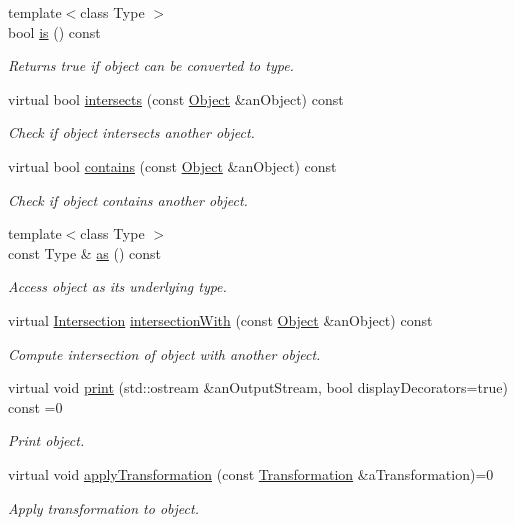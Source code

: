 \begin{DoxyCompactItemize}
{\footnotesize template$<$class Type $>$ }\\bool \hyperlink{classostk_1_1math_1_1geom_1_1d3_1_1_object_ab09a0b47da3dc0ca2d8170aced1ead15}{is} () const
\begin{DoxyCompactList}\small\item\em Returns true if object can be converted to type. \end{DoxyCompactList}\item 
virtual bool \hyperlink{classostk_1_1math_1_1geom_1_1d3_1_1_object_a99bfe722e7508a09a629c9eb972201e6}{intersects} (const \hyperlink{classostk_1_1math_1_1geom_1_1d3_1_1_object}{Object} \&an\+Object) const
\begin{DoxyCompactList}\small\item\em Check if object intersects another object. \end{DoxyCompactList}\item 
virtual bool \hyperlink{classostk_1_1math_1_1geom_1_1d3_1_1_object_a97edbd679b50c4663d3ab20c65cea4b9}{contains} (const \hyperlink{classostk_1_1math_1_1geom_1_1d3_1_1_object}{Object} \&an\+Object) const
\begin{DoxyCompactList}\small\item\em Check if object contains another object. \end{DoxyCompactList}\item 
{\footnotesize template$<$class Type $>$ }\\const Type \& \hyperlink{classostk_1_1math_1_1geom_1_1d3_1_1_object_ad921120c3bf1176035258fad0f654137}{as} () const
\begin{DoxyCompactList}\small\item\em Access object as its underlying type. \end{DoxyCompactList}\item 
virtual \hyperlink{classostk_1_1math_1_1geom_1_1d3_1_1_intersection}{Intersection} \hyperlink{classostk_1_1math_1_1geom_1_1d3_1_1_object_a04622921234740473c7731fa6c5bad0a}{intersection\+With} (const \hyperlink{classostk_1_1math_1_1geom_1_1d3_1_1_object}{Object} \&an\+Object) const
\begin{DoxyCompactList}\small\item\em Compute intersection of object with another object. \end{DoxyCompactList}\item 
virtual void \hyperlink{classostk_1_1math_1_1geom_1_1d3_1_1_object_ab2a2a782503b97d1cecabdfedc636fce}{print} (std\+::ostream \&an\+Output\+Stream, bool display\+Decorators=true) const =0
\begin{DoxyCompactList}\small\item\em Print object. \end{DoxyCompactList}\item 
virtual void \hyperlink{classostk_1_1math_1_1geom_1_1d3_1_1_object_ae9194dd6d2bb4df09292ffc84dccdb1d}{apply\+Transformation} (const \hyperlink{classostk_1_1math_1_1geom_1_1d3_1_1_transformation}{Transformation} \&a\+Transformation)=0
\begin{DoxyCompactList}\small\item\em Apply transformation to object. \end{DoxyCompactList}\end{DoxyCompactItemize}
